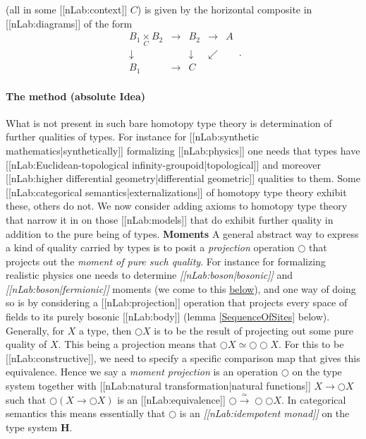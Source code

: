 \documentclass[12pt,titlepage]{article}
\newcommand{\itexarray}[1]{\begin{matrix}#1\end{matrix}}
\theoremstyle{plain}
\theoremstyle{definition}
\theoremstyle{remark}
\begin{document}
(all in some [[nLab:context]] $C$) is given by the horizontal composite in [[nLab:diagrams]] of the form
\begin{displaymath}
\itexarray{
     B_1 \underset{C}{\times} B_2 &\longrightarrow& B_2 &\longrightarrow& A
     \\
     \downarrow && \downarrow & \swarrow
     \\
     B_1 &\longrightarrow& C
  }
  \,.
\end{displaymath}
\hypertarget{the_method_absolute_idea}{}\paragraph*{{The method (absolute Idea)}}\label{the_method_absolute_idea}
What is not present in such bare homotopy type theory is determination of further qualities of types. For instance for [[nLab:synthetic mathematics|synthetically]] formalizing [[nLab:physics]] one needs that types have [[nLab:Euclidean-topological infinity-groupoid|topological]] and moreover [[nLab:higher differential geometry|differential geometric]] qualities to them. Some [[nLab:categorical semantics|externalizations]] of homotopy type theory exhibit these, others do not. We now consider adding axioms to homotopy type theory that narrow it in on those [[nLab:models]] that do exhibit further quality in addition to the pure being of types.
\textbf{Moments}
A general abstract way to express a kind of quality carried by types is to posit a \emph{projection} operation $\bigcirc$ that projects out the \emph{moment of pure such quality}.
For instance for formalizing realistic physics one needs to determine \emph{[[nLab:boson|bosonic]]} and \emph{[[nLab:boson|fermionic]]} moments (we come to this \hyperlink{Externalization}{below}), and one way of doing so is by considering a [[nLab:projection]] operation that projects every space of fields to its purely bosonic [[nLab:body]] (lemma \ref{SequenceOfSites} below).
Generally, for $X$ a type, then $\bigcirc X$ is to be the result of projecting out some pure quality of $X$. This being a projection means that $\bigcirc X  \simeq \bigcirc \bigcirc X$. For this to be [[nLab:constructive]], we need to specify a specific comparison map that gives this equivalence. Hence we say a \emph{moment projection} is an operation $\bigcirc$ on the type system together with [[nLab:natural transformation|natural functions]] $X \to \bigcirc X$ such that $\bigcirc(X \to \bigcirc X)$ is an [[nLab:equivalence]] $\bigcirc \stackrel{\simeq}{\longrightarrow} \bigcirc \bigcirc X$.
In categorical semantics this means essentially that $\bigcirc$ is an \emph{[[nLab:idempotent monad]]} on the type system $\mathbf{H}$.
\end{document}
